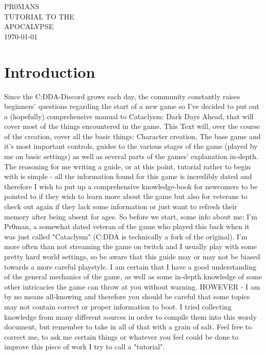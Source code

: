 \documentclass[11pt]{report}
\begin{document}
\vspace*{3cm}
\begin{center}
\uppercase{
\fontsize{3.4cm}{3.4cm}\selectfont
Pr0mans\\
\fontsize{1.5cm}{2cm}\selectfont Tutorial to the\\
\fontsize{2.5cm}{2.5cm}\selectfont Apocalypse}\\
\normalsize \vspace{5cm} \today
\end{center}

\tableofcontents


\chapter{Introduction}
 
Since the C:DDA-Discord grows each day, the community constantly raises beginners' questions regarding the start of a new game so I've decided to put out a (hopefully) comprehensive manual to Cataclysm: Dark Days Ahead, that will cover most of the things encountered in the game. This Text will, over the course of the creation, cover all the basic things: Character creation, The base game and it's most important controls, guides to the various stages of the game (played by me on basic settings) as well as several parts of the games' explanation in-depth.
The reasoning for me writing a guide, or at this point, tutorial rather to begin with is simple - all the information found for this game is incredibly dated and therefore I wish to put up a comprehensive knowledge-book for newcomers to be pointed to if they wish to learn more about the game but also for veterans to check out again if they lack some information or just want to refresh their memory after being absent for ages.
So before we start, some info about me: I'm Pr0man, a somewhat dated veteran of the game who played this back when it was just called "Cataclysm" (C:DDA is technically a fork of the original). I'm more often than not streaming the game on twitch and I usually play with some pretty hard world settings, so be aware that this guide may or may not be biased towards a more careful playstyle. I am certain that I have a good understanding of the general mechanics of the game, as well as some in-depth knowledge of some other intricacies the game can throw at you without warning.
HOWEVER - I am by no means all-knowing and therefore you should be careful that some topics may not contain correct or proper information to boot. I tried collecting knowledge from many different sources in order to compile them into this wordy document, but remember to take in all of that with a grain of salt. Feel free to correct me, to ask me certain things or whatever you feel could be done to improve this piece of work I try to call a "tutorial".
\end{document}
